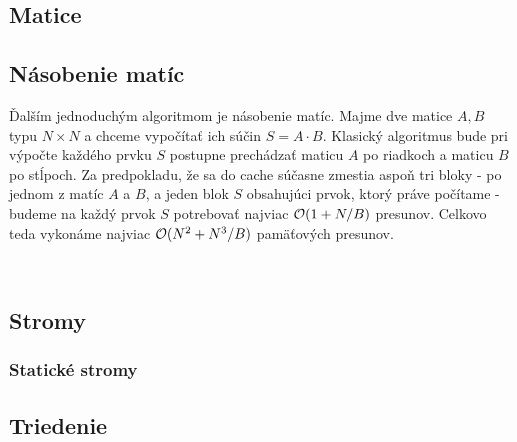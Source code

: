 \subsection{Matice}

\subsection{Násobenie matíc}

Ďalším jednoduchým \obliv algoritmom je násobenie matíc. Majme dve matice $A, B$ typu $N \times N$ a chceme vypočítať ich súčin $S = A \cdot B$. Klasický algoritmus bude pri výpočte každého prvku $S$ postupne prechádzať maticu $A$ po riadkoch a maticu $B$ po stĺpoch. Za predpokladu, že sa do cache súčasne zmestia aspoň tri bloky - po jednom z matíc $A$ a $B$, a jeden blok $S$ obsahujúci prvok, ktorý práve počítame - budeme na každý prvok $S$ potrebovať najviac $\mathcal{O}(1+N/B)$ presunov. Celkovo teda vykonáme najviac $\mathcal{O}(N^2 + N^3/B)$ pamäťových presunov. 

\



\subsection{Stromy}
\subsubsection{Statické stromy}




\subsection{Triedenie}

